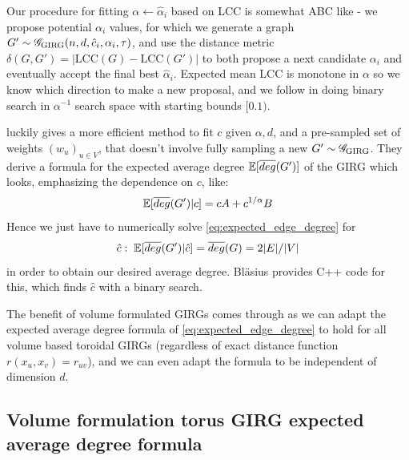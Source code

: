 Our procedure for fitting $\alpha \gets \hat{\alpha}_i$ based on LCC is somewhat ABC like - we propose potential $\alpha_i$ values, for which we generate a graph $G' \sim \mathscr{G}_{\mathrm{GIRG}}(n, d, \hat{c}_i, \alpha_i, \tau)$, and use the distance metric $\delta(G, G') = |\mathrm{LCC}(G) - \mathrm{LCC}(G')|$ to both propose a next candidate $\alpha_i$ and eventually accept the final best $\hat{\alpha}_i$. Expected mean LCC is monotone in $\alpha$ so we know which direction to make a new proposal, and we follow \cite{blasius2018towards} in doing binary search in $\alpha^{-1}$ search space with starting bounds $[0. 1)$.

\cite{blasius2022efficiently} luckily gives a more efficient method to fit $c$ given $\alpha, d$, and a pre-sampled set of weights $(w_u)_{u \in V}$, that doesn't involve fully sampling a new $G' \sim \mathscr{G}_{\mathrm{GIRG}}$. They derive a formula for the expected average degree $\mathbb{E}[\overline{deg}(G')]$ of the GIRG which looks, emphasizing the dependence on $c$, like:
\begin{equation}
    \label{eq:expected_edge_degree}
    \mathbb{E}[\overline{deg}(G') | c] = c A + c^{1/\alpha} B
\end{equation}
Hence we just have to numerically solve \cref{eq:expected_edge_degree} for
\begin{equation}
    \hat{c}:\; \mathbb{E}[\overline{deg}(G') | \hat{c}] = \overline{deg}(G) = 2 |E|/|V|
\end{equation} in order to obtain our desired average degree. Bl{\"a}sius provides C++ code for this, which finds $\hat{c}$ with a binary search.

The benefit of volume formulated GIRGs comes through as we can adapt the
expected average degree formula of \cref{eq:expected_edge_degree} to hold for all volume based toroidal GIRGs (regardless of exact distance function $r(x_u, x_v) = r_{uv}$), and we can even adapt the formula to be independent of dimension $d$.

\subsection{Volume formulation torus GIRG expected average degree formula}
\label{subsec:average_degree_formula}

